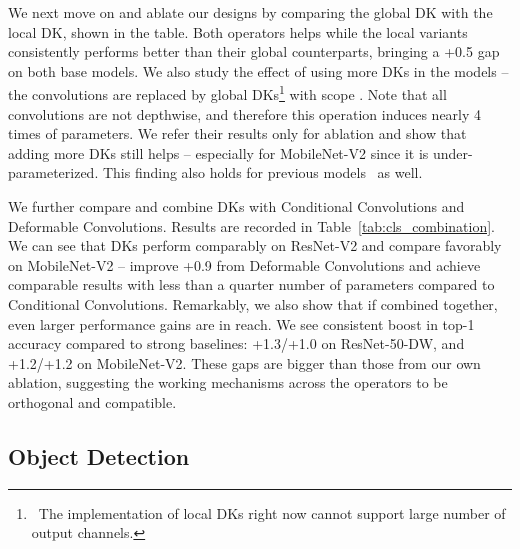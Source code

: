 \documentclass{article} \usepackage{iclr2020_conference, times}
\begin{document}
We next move on and ablate our designs by comparing the global DK with the
local DK, shown in the table.
Both operators helps while the local variants consistently performs better than
their global counterparts, bringing a +0.5 gap on both base models.
We also study the effect of using more DKs in the models -- the 
convolutions are replaced by global DKs\footnote{\
    The implementation of local DKs right now cannot support large number of
    output channels.
} with scope .
Note that all  convolutions are not depthwise, and therefore
this operation induces nearly 4 times of parameters.
We refer their results only for ablation and show that adding more DKs
still helps -- especially for MobileNet-V2 since it is under-parameterized.
This finding also holds for previous models~\citep{yang2019soft} as well.

We further compare and combine DKs with Conditional Convolutions and Deformable
Convolutions.
Results are recorded in Table~\ref{tab:cls_combination}.
We can see that DKs perform comparably on ResNet-V2 and compare favorably on
MobileNet-V2 -- improve +0.9 from Deformable Convolutions and achieve comparable
results with less than a quarter number of parameters compared to Conditional
Convolutions.
Remarkably, we also show that if combined together, even larger performance
gains are in reach.
We see consistent boost in top-1 accuracy compared to strong baselines:
+1.3/+1.0 on ResNet-50-DW, and +1.2/+1.2 on MobileNet-V2.
These gaps are bigger than those from our own ablation, suggesting the working
mechanisms across the operators to be orthogonal and compatible.


\subsection{Object Detection} \label{sec:det}
\end{document}
